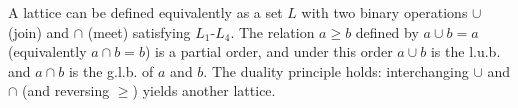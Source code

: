 A lattice can be defined equivalently as a set $L$ with two binary operations $\cup$ (join) and $\cap$ (meet) satisfying $L_1$-$L_4$. The relation $a \geq b$ defined by $a \cup b = a$ (equivalently $a \cap b = b$) is a partial order, and under this order $a \cup b$ is the l.u.b. and $a \cap b$ is the g.l.b. of $a$ and $b$. The duality principle holds: interchanging $\cup$ and $\cap$ (and reversing $\geq$) yields another lattice.
